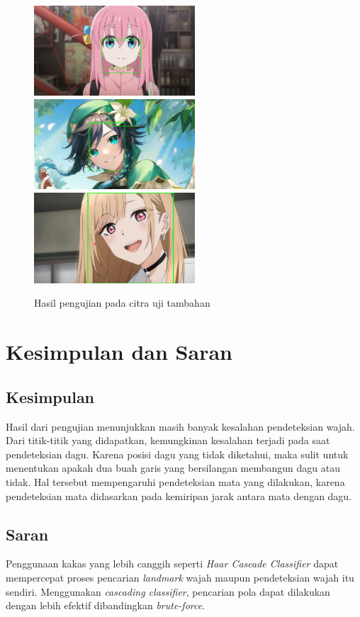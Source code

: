 \documentclass[conference, a4paper]{IEEEtran}
\begin{document}
\begin{figure}[h]
  \begin{center}
    \includegraphics[width=6cm]{img/result_bocchi.jpg}
    \includegraphics[width=6cm]{img/result_venti.jpg}
    \includegraphics[width=6cm]{img/result_marin.jpg}
  \end{center}
  \caption{Hasil pengujian pada citra uji tambahan}\label{extrares}
\end{figure}

\section{Kesimpulan dan Saran}
\subsection{Kesimpulan}
Hasil dari pengujian menunjukkan masih banyak kesalahan pendeteksian wajah. Dari titik-titik yang didapatkan, kemungkinan kesalahan terjadi pada saat pendeteksian dagu. Karena posisi dagu yang tidak diketahui, maka sulit untuk menentukan apakah dua buah garis yang bersilangan membangun dagu atau tidak. Hal tersebut mempengaruhi pendeteksian mata yang dilakukan, karena pendeteksian mata didasarkan pada kemiripan jarak antara mata dengan dagu.

\subsection{Saran}
Penggunaan kakas yang lebih canggih seperti \textit{Haar Cascade Classifier} dapat mempercepat proses pencarian \textit{landmark} wajah maupun pendeteksian wajah itu sendiri. Menggunakan \textit{cascading classifier}, pencarian pola dapat dilakukan dengan lebih efektif dibandingkan \textit{brute-force}.
\end{document}
